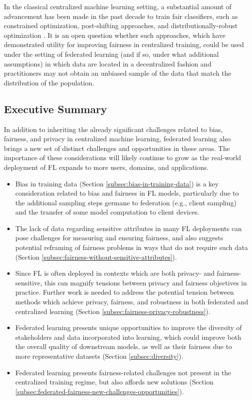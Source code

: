 \documentclass[11pt]{article}
\begin{document}
In the classical centralized machine learning setting, a substantial amount of advancement has been made in the past decade to train fair classifiers, such as constrained optimization, post-shifting approaches, and distributionally-robust optimization \cite{hardt2016, zafar2017, hashimoto2018fairness}. It is an open question whether such approaches, which have demonstrated utility for improving fairness in centralized training, could be used under the setting of federated learning (and if so, under what additional assumptions) in which data are located in a decentralized fashion and practitioners may not obtain an unbiased sample of the data that match the distribution of the population.  

\subsection{Executive Summary}

In addition to inheriting the already significant challenges related to bias, fairness, and privacy in centralized machine learning, federated learning also brings a new set of distinct challenges and opportunities in these areas. The importance of these considerations will likely continue to grow as the real-world deployment of FL expands to more users, domains, and applications.

\begin{itemize}
    \item Bias in training data (Section \ref{subsec:bias-in-training-data}) is a key consideration related to bias and fairness in FL models, particularly due to the additional sampling steps germane to federation (e.g., client sampling) and the transfer of some model computation to client devices.
    \item The lack of data regarding sensitive attributes in many FL deployments can pose challenges for measuring and ensuring fairness, and also suggests potential reframing of fairness problems in ways that do not require such data (Section \ref{subsec:fairness-without-sensitive-attributes}).
    \item Since FL is often deployed in contexts which are both privacy- and fairness-sensitive, this can magnify tensions between privacy and fairness objectives in practice. Further work is needed to address the potential tension between methods which achieve privacy, fairness, and robustness in both federated and centralized learning (Section \ref{subsec:fairness-privacy-robustness}).
    \item Federated learning presents unique opportunities to improve the diversity of stakeholders and data incorporated into learning, which could improve both the overall quality of downstream models, as well as their fairness due to more representative datasets (Section \ref{subsec:diversity}).
    \item Federated learning presents fairness-related challenges not present in the centralized training regime, but also affords new solutions (Section \ref{subsec:federated-fairness-new-challenges-opportunities}).
\end{itemize}
\end{document}
